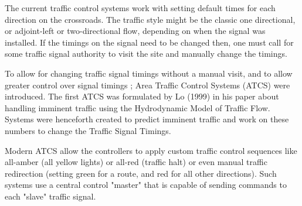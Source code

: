\documentclass[twoside,a4paper,12pt]{book}
\begin{document}


{   \setlength{\parindent}{11mm} }
{ \setlength{\parindent}{0mm} }

\noindent
The current traffic control systems work with setting default times for each direction on the crossroads. The traffic style might be the classic one directional, or adjoint-left or two-directional flow, depending on when the signal was installed. If the timings on the signal need to be changed then, one must call for some traffic signal authority to visit the site and manually change the timings.

To allow for changing traffic signal timings without a manual visit, and to allow greater control over signal timings ; Area Traffic Control Systems (ATCS) were introduced. The first ATCS was formulated by Lo (1999) in his paper about handling imminent traffic using the Hydrodynamic Model of Traffic Flow. Systems were henceforth created to predict imminent traffic and work on these numbers to change the Traffic Signal Timings.

Modern ATCS allow the controllers to apply custom traffic control sequences like all-amber (all yellow lights) or all-red (traffic halt) or even manual traffic redirection (setting green for a route, and red for all other directions). Such systems use a central control "master" that is capable of sending commands to each "slave" traffic signal. 






\end{document}
